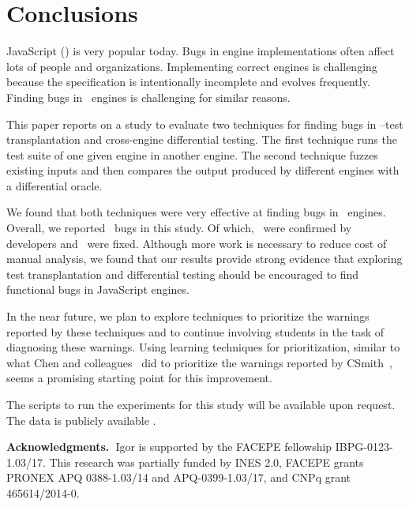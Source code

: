 \documentclass[smallextended]{svjour3}
\begin{document}
\section{Conclusions}


JavaScript (\js{}) is very popular today. Bugs in engine
implementations often affect lots of people and organizations.
Implementing correct engines is challenging because the specification
is intentionally incomplete and evolves frequently. Finding bugs in
\js\ engines is challenging for similar reasons.

This paper reports on a study to evaluate two
techniques for finding bugs in \js{}--test transplantation and
cross-engine differential testing. The first technique
runs the test suite of one given engine in another engine.
The second technique fuzzes existing inputs and then compares the
output produced by different engines with a differential oracle.

We found that both techniques were very effective at finding bugs in
\js\ engines.  Overall, we reported \totalBugsReported\ bugs in this
study. Of which, \totalBugsConfirmed\ were confirmed by developers and
\totalBugsFixed\ were fixed. Although more work is necessary to reduce
cost of manual analysis, we found that our results provide strong
evidence that exploring test transplantation and differential testing
should be encouraged to find functional bugs in JavaScript engines.

In the near future, we plan to explore techniques to prioritize the
warnings reported by these techniques and to continue involving
students in the task of diagnosing these warnings. Using learning
techniques for prioritization, similar to what Chen and
colleagues~\cite{Chen:2017:LPT:3097368.3097451} did to prioritize the
warnings reported by CSmith~\cite{Yang:2011:FUB:1993498.1993532},
seems a promising starting point for this improvement.

The scripts to run the experiments for this study will be available
upon request. The data is publicly available \dataRepo{}.

\vspace{1ex}
\sloppy
\noindent\textbf{Acknowledgments.~}Igor is supported by the FACEPE
fellowship IBPG-0123-1.03/17. This research was partially funded by
INES 2.0, FACEPE grants PRONEX APQ 0388-1.03/14 and APQ-0399-1.03/17,
and CNPq grant 465614/2014-0.

\balance
%


\end{document}

